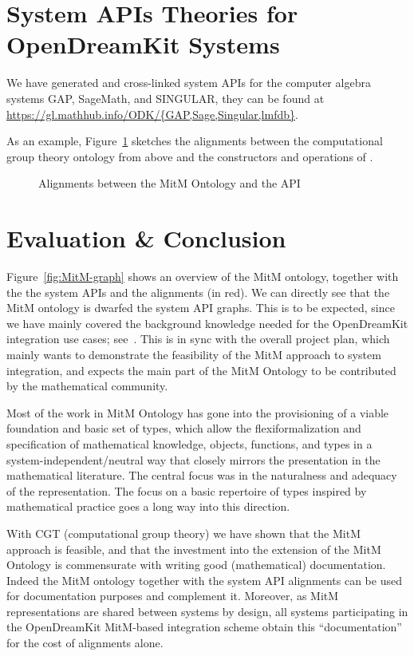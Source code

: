 \documentclass[book]{deliverablereport}
\begin{document}
\section{System APIs Theories for OpenDreamKit Systems}

We have generated and cross-linked system APIs for the computer algebra systems GAP,
SageMath, and SINGULAR, they can be found at
\url{https://gl.mathhub.info/ODK/{GAP,Sage,Singular,lmfdb}}.

As an example, Figure~\ref{fig:cgtontology} sketches the alignments between the
computational group theory ontology from above and the constructors and operations of
\GAP.

\begin{figure}[ht]\centering
  \caption{Alignments between the MitM Ontology and the \GAP API}\label{fig:cgtontology}
\end{figure}

\section{Evaluation \& Conclusion}\label{sec:concl}
Figure~\ref{fig:MitM-graph} shows an overview of the MitM ontology, together with the the
system APIs and the alignments (in red). We can directly see that the MitM ontology is
dwarfed the system API graphs. This is to be expected, since we have mainly covered the
background knowledge needed for the OpenDreamKit integration use cases;
see~\cite{ODK-D6.5}. This is in sync with the overall project plan, which mainly wants to
demonstrate the feasibility of the MitM approach to system integration, and expects the
main part of the MitM Ontology to be contributed by the mathematical community.

Most of the work in MitM Ontology has gone into the provisioning of a viable foundation
and basic set of types, which allow the flexiformalization and specification of
mathematical knowledge, objects, functions, and types in a system-independent/neutral way
that closely mirrors the presentation in the mathematical literature. The central focus
was in the naturalness and adequacy of the representation. The focus on a basic repertoire
of types inspired by mathematical practice goes a long way into this direction.

With CGT (computational group theory) we have shown that the MitM approach is feasible,
and that the investment into the extension of the MitM Ontology is commensurate with
writing good (mathematical) documentation. Indeed the MitM ontology together with the
system API alignments can be used for documentation purposes and complement it. Moreover, as
MitM representations are shared between systems by design, all systems participating in
the OpenDreamKit MitM-based integration scheme obtain this ``documentation'' for the cost
of alignments alone. 
\end{document}
